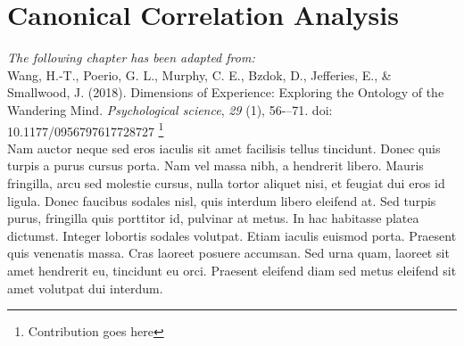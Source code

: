 \chapter{Canonical Correlation Analysis}
\label{ch:methods}
\textit{The following chapter has been adapted from:\\}
Wang, H.-T., Poerio, G. L., Murphy, C. E., Bzdok, D., Jefferies, E., \& Smallwood, J. (2018). Dimensions of Experience: Exploring the Ontology of the Wandering Mind. \textit{Psychological science}, \textit{29} (1), 56-–71. doi: 10.1177/0956797617728727
\footnote{
Contribution goes here
}\\

\newpage
\noindent{}Nam auctor neque sed eros iaculis sit amet facilisis tellus tincidunt. Donec quis turpis a purus cursus porta. Nam vel massa nibh, a hendrerit libero. Mauris fringilla, arcu sed molestie cursus, nulla tortor aliquet nisi, et feugiat dui eros id ligula. Donec faucibus sodales nisl, quis interdum libero eleifend at. Sed turpis purus, fringilla quis porttitor id, pulvinar at metus. In hac habitasse platea dictumst. Integer lobortis sodales volutpat. Etiam iaculis euismod porta. Praesent quis venenatis massa. Cras laoreet posuere accumsan. Sed urna quam, laoreet sit amet hendrerit eu, tincidunt eu orci. Praesent eleifend diam sed metus eleifend sit amet volutpat dui interdum.



